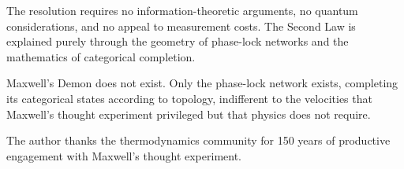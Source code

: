 \documentclass[twocolumn,showpacs,preprintnumbers,amsmath,amssymb,prd]{revtex4-2}
\theoremstyle{definition}
\theoremstyle{remark}
\begin{document}
The resolution requires no information-theoretic arguments, no quantum considerations, and no appeal to measurement costs. The Second Law is explained purely through the geometry of phase-lock networks and the mathematics of categorical completion.

Maxwell's Demon does not exist. Only the phase-lock network exists, completing its categorical states according to topology, indifferent to the velocities that Maxwell's thought experiment privileged but that physics does not require.

\begin{acknowledgments}
The author thanks the thermodynamics community for 150 years of productive engagement with Maxwell's thought experiment.
\end{acknowledgments}


\end{document}
